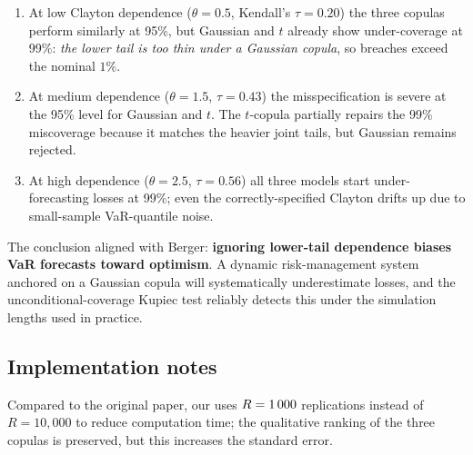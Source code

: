 \begin{enumerate}\setlength\itemsep{0pt}
\item At low Clayton dependence ($\theta=0.5$, Kendall's $\tau=0.20$) the
      three copulas perform similarly at 95\%, but Gaussian and $t$ already
      show under-coverage at 99\%: \emph{the lower tail is too thin under
      a Gaussian copula}, so breaches exceed the nominal $1\%$.
\item At medium dependence ($\theta=1.5$, $\tau=0.43$) the misspecification
      is severe at the 95\% level for Gaussian and $t$. The $t$-copula partially
      repairs the 99\% miscoverage because it matches the heavier joint tails,
      but Gaussian remains rejected.
\item At high dependence ($\theta=2.5$, $\tau=0.56$) all three models start
      under-forecasting losses at 99\%; even the correctly-specified Clayton
      drifts up due to small-sample VaR-quantile noise.
\end{enumerate}

The conclusion aligned with Berger: \textbf{ignoring lower-tail
dependence biases VaR forecasts toward optimism}. A dynamic risk-management
system anchored on a Gaussian copula will systematically underestimate
losses, and the unconditional-coverage Kupiec test reliably detects this
under the simulation lengths used in practice.

\subsection{Implementation notes}

Compared to the original paper, our  uses $R=1\,000$
replications instead of $R=10{,}000$ to reduce computation time; the
qualitative ranking of the three copulas is preserved, but this increases
the standard error.
